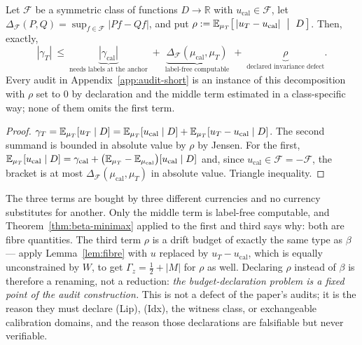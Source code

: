 \begin{proposition}\label{prop:threeterm}
Let $\mathcal F$ be a symmetric class of functions $D\to\mathbb R$ with
$u_{\mathrm{cal}}\in\mathcal F$, let
$\Delta_{\mathcal F}(P,Q)=\sup_{f\in\mathcal F}|Pf-Qf|$, and put
$\rho:=\E_{\mu_T}\bigl[\,|u_T-u_{\mathrm{cal}}|\ \bigm|\ D\,\bigr]$. Then, exactly,
\[
|\gamma_T|\ \le\ \underbrace{|\gamma_{\mathrm{cal}}|}_{\text{needs labels at the anchor}}
\;+\;\underbrace{\Delta_{\mathcal F}(\mu_{\mathrm{cal}},\mu_T)}_{\text{label-free computable}}
\;+\;\underbrace{\rho}_{\text{declared invariance defect}} .
\]
Every audit in Appendix~\ref{app:audit-short} is an instance of this decomposition with
$\rho$ set to $0$ by declaration and the middle term estimated in a class-specific way; none
of them omits the first term.
\end{proposition}
\begin{proof}
$\gamma_T=\mathbb{E}_{\mu_T}[u_T\mid D]
=\mathbb{E}_{\mu_T}[u_{\mathrm{cal}}\mid D]+\mathbb{E}_{\mu_T}[u_T-u_{\mathrm{cal}}\mid D]$.
The second summand is bounded in absolute value by $\rho$ by Jensen. For the first,
$\mathbb{E}_{\mu_T}[u_{\mathrm{cal}}\mid D]
=\gamma_{\mathrm{cal}}+\bigl(\mathbb{E}_{\mu_T}-\mathbb{E}_{\mu_{\mathrm{cal}}}\bigr)[u_{\mathrm{cal}}\mid D]$
and, since $u_{\mathrm{cal}}\in\mathcal F=-\mathcal F$, the bracket is at most
$\Delta_{\mathcal F}(\mu_{\mathrm{cal}},\mu_T)$ in absolute value. Triangle inequality.
\end{proof}

\begin{remark}\label{rem:reading}
The three terms are bought by three different currencies and no currency substitutes for
another. Only the middle term is label-free computable, and
Theorem~\ref{thm:beta-minimax} applied to the first and third says why: both are fibre
quantities. The third term $\rho$ is a drift budget of exactly the same type as $\beta$ ---
apply Lemma~\ref{lem:fibre} with $u$ replaced by $u_T-u_{\mathrm{cal}}$, which is equally
unconstrained by $W$, to get $\Gamma_z=\tfrac12+|M|$ for $\rho$ as well. Declaring $\rho$
instead of $\beta$ is therefore a renaming, not a reduction: \emph{the budget-declaration
problem is a fixed point of the audit construction.} This is not a defect of the paper's
audits; it is the reason they must declare (Lip), (Idx), the witness class, or exchangeable
calibration domains, and the reason those declarations are falsifiable but never verifiable.
\end{remark}

